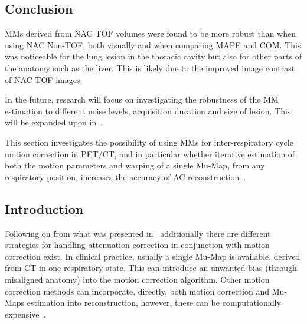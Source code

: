         \subsection{Conclusion} \label{sec:impact_of_tof_on_respiratory_motion_model_estimation_using_pre_gated_no_intra_cycle_motion_nAC_pet_conclusion}
            \glspl{MM} derived from \gls{NAC} \gls{TOF} volumes were found to be more robust than when using \gls{NAC} \gls{Non-TOF}, both visually and when comparing \gls{MAPE} and \gls{COM}. This was noticeable for the lung lesion in the thoracic cavity but also for other parts of the anatomy such as the liver. This is likely due to the improved image contrast of \gls{NAC} \gls{TOF} images.

            In the future, research will focus on investigating the robustness of the \gls{MM} estimation to different noise levels, acquisition duration and size of lesion. This will be expanded upon in~.
    
        This section investigates the possibility of using \glspl{MM} for inter-respiratory cycle motion correction in \gls{PET}/\gls{CT}, and in particular whether iterative estimation of both the motion parameters and warping of a single \gls{Mu-Map}, from any respiratory position, increases the accuracy of \gls{AC} reconstruction~\parencite{Whitehead2020PET/CTFields}.
        
        \subsection{Introduction} \label{sec:pet_ct_respiratory_motion_correction_with_a_single_attenuation_map_using_nAC_derived_deformation_fields_introduction}
            Following on from what was presented in~ additionally there are different strategies for handling attenuation correction in conjunction with motion correction exist. In clinical practice, usually a single \gls{Mu-Map} is available, derived from \gls{CT} in one respiratory state. This can introduce an unwanted bias (through misaligned anatomy) into the motion correction algorithm. Other motion correction methods can incorporate, directly, both motion correction and \glspl{Mu-Map} estimation into reconstruction, however, these can be computationally expensive~\parencite{Bousse2016a, Bousse2016}.
            
